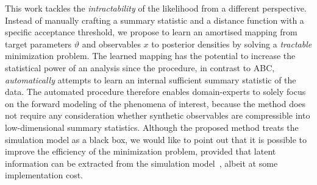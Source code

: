 \documentclass[fleqn,usenatbib]{mnras}
\begin{document}
\medskip

This work tackles the \emph{intractability} of the likelihood from a different perspective. Instead of
manually crafting a summary statistic and a distance function with a specific
acceptance threshold, we propose to
learn an amortised mapping
from target parameters $\vartheta$ and observables $x$ to posterior densities by solving a
\emph{tractable} minimization problem.
The learned mapping has the potential
to increase the statistical power of an analysis since the procedure, in contrast to ABC,
\emph{automatically} attempts to learn an internal sufficient summary statistic of the data.
The automated procedure therefore enables domain-experts
to solely focus on the forward modeling of the phenomena of interest, because the method
does not require any consideration whether synthetic observables are compressible
into low-dimensional summary statistics.
Although the proposed method treats the simulation model as a black box,
we would like to point out that it is possible to improve the efficiency
of the minimization problem, provided that latent information
can be extracted from the simulation model~\citep{brehmer2018constraining,Brehmer:2019jyt,brehmer2020mining},
albeit at some implementation cost.
\end{document}
